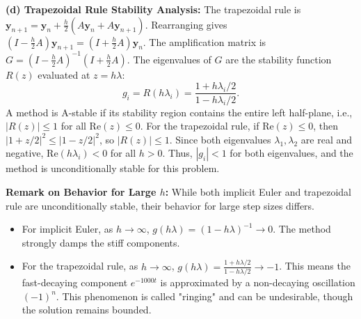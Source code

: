 \begin{solution}
\textbf{(d) Trapezoidal Rule Stability Analysis:}
The trapezoidal rule is $\mathbf{y}_{n+1} = \mathbf{y}_n + \frac{h}{2} (A\mathbf{y}_n + A\mathbf{y}_{n+1})$.
Rearranging gives $(I - \frac{h}{2}A)\mathbf{y}_{n+1} = (I + \frac{h}{2}A)\mathbf{y}_n$.
The amplification matrix is $G = (I - \frac{h}{2}A)^{-1}(I + \frac{h}{2}A)$.
The eigenvalues of $G$ are the stability function $R(z)$ evaluated at $z=h\lambda$:
\[ g_i = R(h\lambda_i) = \frac{1 + h\lambda_i/2}{1 - h\lambda_i/2}. \]
A method is A-stable if its stability region contains the entire left half-plane, i.e., $|R(z)| \leq 1$ for all $\text{Re}(z) \leq 0$.
For the trapezoidal rule, if $\text{Re}(z) \leq 0$, then $|1+z/2|^2 \leq |1-z/2|^2$, so $|R(z)| \leq 1$.
Since both eigenvalues $\lambda_1, \lambda_2$ are real and negative, $\text{Re}(h\lambda_i) < 0$ for all $h > 0$.
Thus, $|g_i| < 1$ for both eigenvalues, and the method is unconditionally stable for this problem.

\textbf{Remark on Behavior for Large $h$:} While both implicit Euler and trapezoidal rule are unconditionally stable, their behavior for large step sizes differs.
\begin{itemize}
    \item For implicit Euler, as $h \to \infty$, $g(h\lambda) = (1-h\lambda)^{-1} \to 0$. The method strongly damps the stiff components.
    \item For the trapezoidal rule, as $h \to \infty$, $g(h\lambda) = \frac{1+h\lambda/2}{1-h\lambda/2} \to -1$. This means the fast-decaying component $e^{-1000t}$ is approximated by a non-decaying oscillation $(-1)^n$. This phenomenon is called "ringing" and can be undesirable, though the solution remains bounded.
\end{itemize}
\end{solution}
